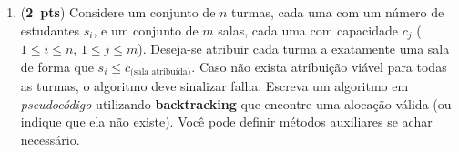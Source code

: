 \documentclass[12pt]{article}
\begin{document}
\begin{enumerate}
 \item (\textbf{2~pts}) Considere um conjunto de $n$ turmas, cada uma com um número de estudantes $s_i$, e um conjunto de $m$ salas, cada uma com capacidade $c_j$ ($1 \leq i \leq n$, $1 \leq j \leq m$). Deseja-se atribuir cada turma a exatamente uma sala de forma que $s_i \leq c_{\text{(sala atribuída)}}$. Caso não exista atribuição viável para todas as turmas, o algoritmo deve sinalizar falha. Escreva um algoritmo em \emph{pseudocódigo} utilizando \textbf{backtracking} que encontre uma alocação válida (ou indique que ela não existe). Você pode definir métodos auxiliares se achar necessário.

\end{enumerate}
\end{document}
